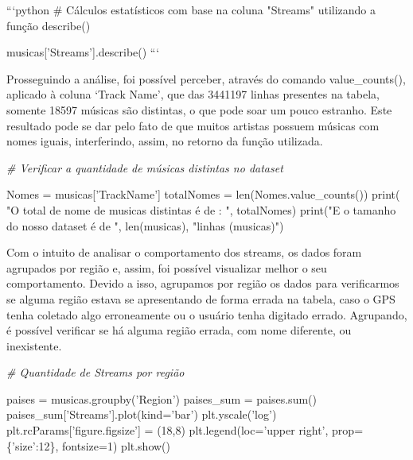 \documentclass[11pt]{article}
\newenvironment{Shaded}{}{}
\newcommand{\DecValTok}[1]{\textcolor[rgb]{0.25,0.63,0.44}{{#1}}}
\newcommand{\StringTok}[1]{\textcolor[rgb]{0.25,0.44,0.63}{{#1}}}
\newcommand{\CommentTok}[1]{\textcolor[rgb]{0.38,0.63,0.69}{\textit{{#1}}}}
\newcommand{\NormalTok}[1]{{#1}}
\newcommand{\OperatorTok}[1]{\textcolor[rgb]{0.40,0.40,0.40}{{#1}}}
\newcommand{\BuiltInTok}[1]{{#1}}
\begin{document}
    ```python \# Cálculos estatísticos com base na coluna "Streams"
utilizando a função describe()

musicas{[}'Streams'{]}.describe() ```

    Prosseguindo a análise, foi possível perceber, através do comando
value\_counts(), aplicado à coluna `Track Name', que das 3441197 linhas
presentes na tabela, somente 18597 músicas são distintas, o que pode
soar um pouco estranho. Este resultado pode se dar pelo fato de que
muitos artistas possuem músicas com nomes iguais, interferindo, assim,
no retorno da função utilizada.

    \begin{Shaded}
\begin{Highlighting}[]
    \CommentTok{# Verificar a quantidade de músicas distintas no dataset}

\NormalTok{Nomes }\OperatorTok{=}\NormalTok{ musicas[}\StringTok{'TrackName'}\NormalTok{]}
\NormalTok{totalNomes }\OperatorTok{=} \BuiltInTok{len}\NormalTok{(Nomes.value_counts())}
\BuiltInTok{print}\NormalTok{( }\StringTok{"O total de nome de musicas distintas é de : "}\NormalTok{, totalNomes)}
\BuiltInTok{print}\NormalTok{(}\StringTok{"E o tamanho do nosso dataset é de "}\NormalTok{, }\BuiltInTok{len}\NormalTok{(musicas), }\StringTok{"linhas (musicas)"}\NormalTok{)}
\end{Highlighting}
\end{Shaded}

    Com o intuito de analisar o comportamento dos streams, os dados foram
agrupados por região e, assim, foi possível visualizar melhor o seu
comportamento. Devido a isso, agrupamos por região os dados para
verificarmos se alguma região estava se apresentando de forma errada na
tabela, caso o GPS tenha coletado algo erroneamente ou o usuário tenha
digitado errado. Agrupando, é possível verificar se há alguma região
errada, com nome diferente, ou inexistente.

    \begin{Shaded}
\begin{Highlighting}[]
    \CommentTok{# Quantidade de Streams por região}

\NormalTok{paises }\OperatorTok{=}\NormalTok{ musicas.groupby(}\StringTok{'Region'}\NormalTok{)}
\NormalTok{paises_sum }\OperatorTok{=}\NormalTok{ paises.}\BuiltInTok{sum}\NormalTok{()}
\NormalTok{paises_sum[}\StringTok{'Streams'}\NormalTok{].plot(kind}\OperatorTok{=}\StringTok{'bar'}\NormalTok{)}
\NormalTok{plt.yscale(}\StringTok{'log'}\NormalTok{)}
\NormalTok{plt.rcParams[}\StringTok{'figure.figsize'}\NormalTok{] }\OperatorTok{=}\NormalTok{ (}\DecValTok{18}\NormalTok{,}\DecValTok{8}\NormalTok{)}
\NormalTok{plt.legend(loc}\OperatorTok{=}\StringTok{'upper right'}\NormalTok{, prop}\OperatorTok{=}\NormalTok{\{}\StringTok{'size'}\NormalTok{:}\DecValTok{12}\NormalTok{\}, fontsize}\OperatorTok{=}\DecValTok{1}\NormalTok{)}
\NormalTok{plt.show()}
\end{Highlighting}
\end{Shaded}
\end{document}
